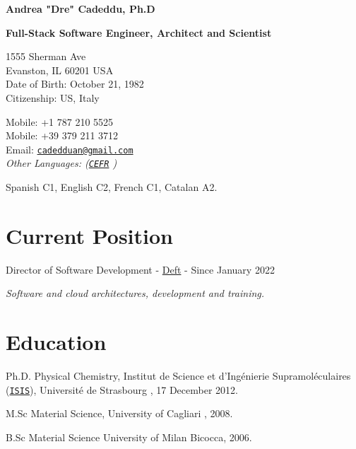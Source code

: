 \documentclass[11pt,letterpaper]{article}
\def\name{Andrea "Dre" Cadeddu, Ph.D }
\renewenvironment{itemize}{
  \begin{list}{}{
    \setlength{\leftmargin}{1.5em}
  }
}{
  \end{list}
}
\begin{document}
{\huge \bf \name}

\vspace{0.25in}
{\Large \bf \sffamily Full-Stack Software Engineer, Architect and Scientist}

\vspace{0.25in}

\begin{minipage}[t]{0.5\textwidth}
  1555 Sherman Ave\\
Evanston, IL 60201
  USA \\
  Date of Birth: October 21, 1982 \\
  Citizenship: US, Italy
\end{minipage}
\begin{minipage}[t]{0.5\textwidth}
  Mobile: +1 787 210 5525\\
  Mobile: +39 379 211 3712 \\
  Email: \href{mailto:cadedduan@gmail.com}{\tt cadedduan@gmail.com} \\
  \textit{Other Languages: (\href{http://en.wikipedia.org/wiki/Common_European_Framework_of_Reference_for_Languages}{\tt CEFR} )} 

Spanish C1,
English C2, 
French C1,
Catalan A2.

\end{minipage}

\section*{Current Position}

\begin{itemize}

\item Director of Software Development - \href{https://www.deft.com}{Deft} - Since January 2022 

\textit{Software and cloud architectures, development and training.}
\end{itemize}
\section*{Education}

\begin{itemize}

  \item  Ph.D. Physical Chemistry, Institut de Science et d'Ing\'enierie Supramol\'eculaires (\href{http://www-isis.u-strasbg.fr/}{\texttt{ISIS}}), Universit\'e de Strasbourg , 17 December 2012.

  \item  M.Sc Material Science, University of Cagliari , 2008.

  \item B.Sc Material Science University of Milan Bicocca, 2006.
  
\end{itemize}
\end{document}
